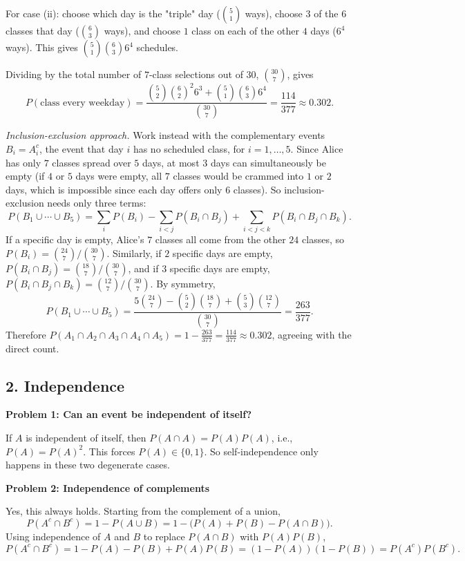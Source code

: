 \documentclass{article}
\begin{document}
For case (ii): choose which day is the "triple" day ($\binom{5}{1}$ ways), choose $3$ of the $6$ classes that day ($\binom{6}{3}$ ways), and choose $1$ class on each of the other $4$ days ($6^4$ ways). This gives $\binom{5}{1}\binom{6}{3}6^4$ schedules.

Dividing by the total number of $7$-class selections out of $30$, $\binom{30}{7}$, gives
$$
P(\text{class every weekday}) = \frac{\binom{5}{2}\binom{6}{2}^2 6^3 + \binom{5}{1}\binom{6}{3}6^4}{\binom{30}{7}} = \frac{114}{377} \approx 0.302.
$$

\emph{Inclusion-exclusion approach.} Work instead with the complementary events $B_i = A_i^c$, the event that day $i$ has no scheduled class, for $i=1,\dots,5$. Since Alice has only $7$ classes spread over $5$ days, at most $3$ days can simultaneously be empty (if $4$ or $5$ days were empty, all $7$ classes would be crammed into $1$ or $2$ days, which is impossible since each day offers only $6$ classes). So inclusion-exclusion needs only three terms:
$$
P(B_1\cup\cdots\cup B_5) = \sum_i P(B_i) - \sum_{i<j}P(B_i\cap B_j) + \sum_{i<j<k}P(B_i\cap B_j\cap B_k).
$$
If a specific day is empty, Alice's $7$ classes all come from the other $24$ classes, so $P(B_i) = \binom{24}{7}/\binom{30}{7}$. Similarly, if $2$ specific days are empty, $P(B_i\cap B_j) = \binom{18}{7}/\binom{30}{7}$, and if $3$ specific days are empty, $P(B_i\cap B_j\cap B_k)=\binom{12}{7}/\binom{30}{7}$. By symmetry,
$$
P(B_1\cup\cdots\cup B_5) = \frac{5\binom{24}{7} - \binom{5}{2}\binom{18}{7} + \binom{5}{3}\binom{12}{7}}{\binom{30}{7}} = \frac{263}{377}.
$$
Therefore $P(A_1\cap A_2\cap A_3\cap A_4\cap A_5) = 1 - \frac{263}{377} = \frac{114}{377} \approx 0.302$, agreeing with the direct count.

\subsection*{2. Independence}

\textbf{Problem 1: Can an event be independent of itself?}

If $A$ is independent of itself, then $P(A\cap A) = P(A)P(A)$, i.e., $P(A) = P(A)^2$. This forces $P(A) \in \{0,1\}$. So self-independence only happens in these two degenerate cases.

\bigskip
\textbf{Problem 2: Independence of complements}

Yes, this always holds. Starting from the complement of a union,
$$P(A^c \cap B^c) = 1 - P(A\cup B) = 1 - \big(P(A)+P(B)-P(A\cap B)\big).$$
Using independence of $A$ and $B$ to replace $P(A\cap B)$ with $P(A)P(B)$,
$$P(A^c\cap B^c) = 1 - P(A) - P(B) + P(A)P(B) = (1-P(A))(1-P(B)) = P(A^c)P(B^c).$$
\end{document}
